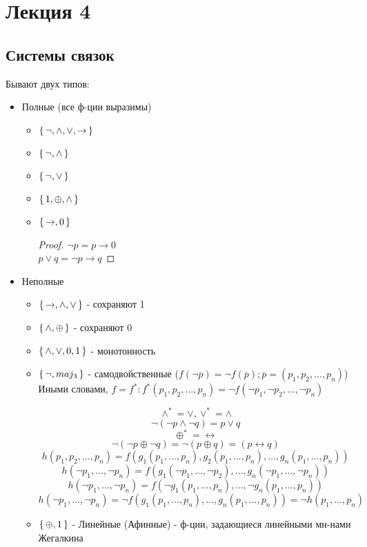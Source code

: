 \section{Лекция 4}
\subsection{Системы связок}
Бывают двух типов:
\begin{itemize}
  \item Полные (все ф-ции выразимы)
    \begin{example}
    \begin{itemize}
      \item $\set{\neg, \land, \lor, \rightarrow}$
      \item $\set{\neg, \land}$
      \item $\set{\neg, \lor}$
      \item $\set{1, \oplus, \land}$
      \item $\set{\rightarrow, 0}$
        \begin{proof}
          $\neg p = p \rightarrow 0$ \\
          $p \lor q = \neg p \rightarrow q$
        \end{proof}
    \end{itemize}
    \end{example}
  \item Неполные
    \begin{itemize}
      \item $\set{\rightarrow, \land, \lor}$ - сохраняют 1
      \item $\set{\land, \oplus}$ - сохраняют 0
      \item $\set{\land, \lor, 0, 1}$ - монотонность
      \item $\set{\neg, maj_3}$ - самодвойственные ($f(\neg \overline{p}) = \neg f(\overline{p}); \overline{p} = (p_1, p_2, \ldots, p_n)$)
        Иными словами, $f = f^{*} \colon f^{*}(p_1, p_2, \ldots, p_n) = \neg f(\neg p_1, \neg p_2, \ldots, \neg p_n)$
        \begin{example}
        \[
        \land^{*} = \lor, \lor^{*} = \land
        \]
        \[
        \neg(\neg p \land \neg q) = p \lor q
        \]
        \[
        \oplus^{*} = \leftrightarrow
        \]
        \[
        \neg (\neg p \oplus \neg q) = \neg(p \oplus q) = (p \leftrightarrow q)
        \]
        \[
        h(p_1, p_2, \ldots, p_n) = f(g_1(p_1, \ldots, p_n), g_2(p_1, \ldots, p_n), \ldots, g_n(p_1, \ldots, p_n))
        \]
        \[
        h(\neg p_1, \ldots, \neg p_n) = f(g_1(\neg p_1, \ldots, \neg p_2), \ldots, g_n(\neg p_1, \ldots, \neg p_n))
        \]
        \[
        h(\neg p_1, \ldots, \neg p_n) = f(\neg g_1(p_1, \ldots, p_n), \ldots, \neg g_n(p_1, \ldots, p_n))
        \]
        \[
        h(\neg p_1, \ldots, \neg p_n) = \neg f(g_1(p_1, \ldots, p_n), \ldots, g_n(p_1, \ldots, p_n)) = \neg h(p_1, \ldots, p_n)
        \]
        \end{example}
  \item $\set{\oplus, 1}$ - Линейные (Афинные) - ф-ции, задающиеся линейными мн-нами Жегалкина
    \end{itemize}
\end{itemize}

